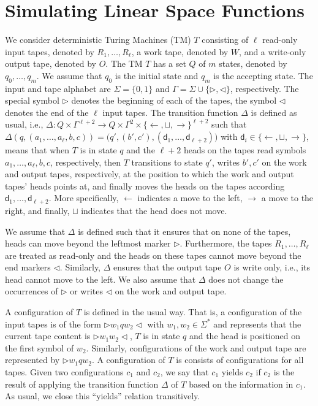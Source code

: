 \section*{Simulating Linear Space Functions}
We consider  deterministic Turing Machines  (TM) $T$ consisting of $\ell$ read-only input tapes, denoted by $R_1,\ldots,R_\ell$,
a work tape, denoted by $W$, and a write-only output tape, denoted by $O$. The TM $T$ has a set $Q$ of $m$
states, denoted by $q_0,\ldots,q_m$. We assume that $q_0$ is the initial state and $q_m$ is the accepting state.
The input and tape alphabet are $\Sigma=\{0,1\}$ and $\Gamma=\Sigma\cup\{\rhd,\lhd\}$, respectively. The special symbol $\rhd$ denotes the beginning of each of the tapes, the symbol $\lhd$ denotes the end of the $\ell$ input tapes. The transition function $\Delta$ is defined as usual, i.e., 
$\Delta:Q\times \Gamma^{\ell+2} \to Q\times \Gamma^{2}\times \{\leftarrow,\sqcup,\rightarrow\}^{\ell+2}$ such that $\Delta(q,(a_1,\ldots,a_{\ell},b,c))=\bigl(q',(b',c'),(\mathsf{d}_1,\ldots,\mathsf{d}_{\ell+2})\bigr)$ with $\mathsf{d}_i\in \{\leftarrow,\sqcup,\rightarrow\}$, means that when $T$ is in state $q$ and the $\ell+2$ heads on the tapes read symbols $a_1,\ldots,a_{\ell},b,c$, respectively, then $T$ transitions to state $q'$, writes $b',c'$ on the work and output tapes, respectively, at the position to which the work and output tapes' heads points at, and finally moves the heads on the tapes according $\mathsf{d}_1,\ldots,\mathsf{d}_{\ell+2}$. More specifically, $\leftarrow$  indicates a move to the left, 
$\rightarrow$ a move to the right, and finally, $\sqcup$ indicates that the head does not move.

We assume that $\Delta$ is defined such that it ensures that on none of the tapes, heads can move beyond the leftmost marker $\rhd$. Furthermore, the tapes $R_1,\ldots,R_\ell$ are treated as read-only and the heads on these tapes cannot move beyond the end markers $\lhd$. Similarly, $\Delta$ ensures that the output tape $O$ is write only, i.e., its head cannot move to the left.  We also assume that $\Delta$ does not change the occurrences of $\rhd$ or writes $\lhd$ on the work and output tape.

A configuration of $T$ is defined in the usual way. That is, a configuration of the input tapes is of the form
$\rhd w_1qw_2\lhd$ with $w_1,w_2\in\Sigma^*$ and represents that the current tape content is $\rhd w_1w_2\lhd$, $T$ is in state $q$ and the head is positioned on the first symbol of $w_2$. Similarly, configurations of the work and output tape are represented by $\rhd w_1qw_2$. A configuration of $T$ is consists of configurations for all tapes. Given two configurations $c_1$ and $c_2$, we say that $c_1$ yields $c_2$ if $c_2$ is the result of applying the transition function $\Delta$ of $T$ based on the information in $c_1$. As usual, we close this ``yields'' relation transitively.

